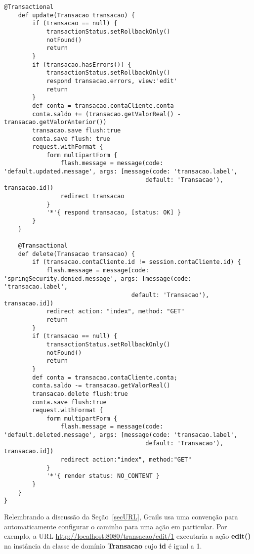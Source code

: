 \begin{lstlisting}[caption=Controlador  {\bf  TransacaoController},  frame=trBL,
    float=htbp, label=codTransacaoController3]
    @Transactional
    def update(Transacao transacao) {
        if (transacao == null) {
            transactionStatus.setRollbackOnly()
            notFound()
            return
        }
        if (transacao.hasErrors()) {
            transactionStatus.setRollbackOnly()
            respond transacao.errors, view:'edit'
            return
        }
        def conta = transacao.contaCliente.conta
        conta.saldo += (transacao.getValorReal() - transacao.getValorAnterior())
        transacao.save flush:true
        conta.save flush: true
        request.withFormat {
            form multipartForm {
                flash.message = message(code: 'default.updated.message', args: [message(code: 'transacao.label', 
                                        default: 'Transacao'), transacao.id])
                redirect transacao
            }
            '*'{ respond transacao, [status: OK] }
        }
    }
    
    @Transactional
    def delete(Transacao transacao) {
        if (transacao.contaCliente.id != session.contaCliente.id) {
            flash.message = message(code: 'springSecurity.denied.message', args: [message(code: 'transacao.label', 
                                    default: 'Transacao'), transacao.id])
            redirect action: "index", method: "GET"
            return
        }
        if (transacao == null) {
            transactionStatus.setRollbackOnly()
            notFound()
            return
        }
        def conta = transacao.contaCliente.conta;
        conta.saldo -= transacao.getValorReal()
        transacao.delete flush:true
        conta.save flush:true
        request.withFormat {
            form multipartForm {
                flash.message = message(code: 'default.deleted.message', args: [message(code: 'transacao.label', 
                                        default: 'Transacao'), transacao.id])
                redirect action:"index", method:"GET"
            }
            '*'{ render status: NO_CONTENT }
        }
    }
}
\end{lstlisting}

\newpage

Relembrando  a discussão da  Seção~\ref{secURL}, Grails  usa uma  convenção para
automaticamente configurar o caminho para uma ação em particular. Por exemplo, a
URL \url{http://localhost:8080/transacao/edit/1} executaria  a ação {\bf edit()}
na instância da classe de domínio {\bf Transacao} cujo {\bf id} é igual a 1. 

\vspace{0.2cm}


